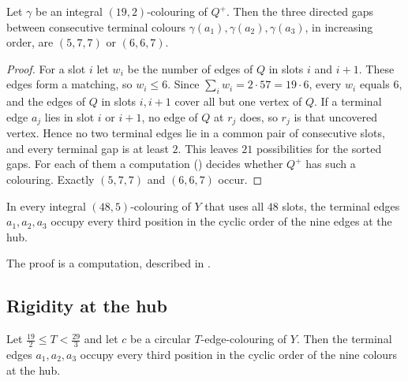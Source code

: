 \documentclass[11pt,colorlinks]{charlie}
\begin{document}
\begin{lemma}\label{lem:half}
Let $\gamma$ be an integral $(19,2)$-colouring of $Q^+$. Then the three directed gaps between consecutive terminal colours $\gamma(a_1),\gamma(a_2),\gamma(a_3)$, in increasing order, are $(5,7,7)$ or $(6,6,7)$.
\end{lemma}

\begin{proof}
For a slot $i$ let $w_i$ be the number of edges of $Q$ in slots $i$ and $i+1$. These edges form a matching, so $w_i\le6$. Since $\sum_iw_i=2\cdot57=19\cdot6$, every $w_i$ equals $6$, and the edges of $Q$ in slots $i,i+1$ cover all but one vertex of $Q$. If a terminal edge $a_j$ lies in slot $i$ or $i+1$, no edge of $Q$ at $r_j$ does, so $r_j$ is that uncovered vertex. Hence no two terminal edges lie in a common pair of consecutive slots, and every terminal gap is at least $2$. This leaves $21$ possibilities for the sorted gaps. For each of them a computation () decides whether $Q^+$ has such a colouring. Exactly $(5,7,7)$ and $(6,6,7)$ occur.
\end{proof}

\begin{lemma}\label{lem:fifth}
In every integral $(48,5)$-colouring of $Y$ that uses all $48$ slots, the terminal edges $a_1,a_2,a_3$ occupy every third position in the cyclic order of the nine edges at the hub.
\end{lemma}

The proof is a computation, described in .

\subsection{Rigidity at the hub}

\begin{proposition}\label{prop:third}
Let $\frac{19}{2}\le T<\frac{29}{3}$ and let $c$ be a circular $T$-edge-colouring of $Y$. Then the terminal edges $a_1,a_2,a_3$ occupy every third position in the cyclic order of the nine colours at the hub.
\end{proposition}
\end{document}
